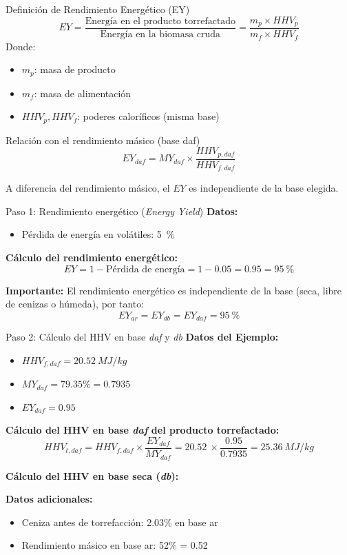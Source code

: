 \documentclass[main.tex]{subfiles}
\begin{document}
\begin{frame}{Definición de Rendimiento Energético (EY)}
\[
EY=\frac{\text{Energía en el producto torrefactado}}{\text{Energía en la biomasa cruda}}
     =\frac{m_p \times HHV_p}{m_f \times HHV_f}
\]
Donde:
\begin{itemize}
  \item $m_p$: masa de producto
  \item $m_f$: masa de alimentación
  \item $HHV_p, HHV_f$: poderes caloríficos (misma base)
\end{itemize}
\begin{block}{Relación con el rendimiento másico (base daf)}
\[
EY_{daf}= MY_{daf} \times \frac{HHV_{p,daf}}{HHV_{f,daf}}
\]
\end{block}
A diferencia del rendimiento másico, el $EY$ es independiente de la base elegida.
\end{frame}

\begin{frame}{Paso 1: Rendimiento energético (\textit{Energy Yield})}
\small
\textbf{Datos:}
\begin{itemize}
  \item Pérdida de energía en volátiles: \SI{5}{\percent}
\end{itemize}

\vspace{0.3cm}
\textbf{Cálculo del rendimiento energético:}
\[
EY = 1 - \text{Pérdida de energía} = 1 - 0.05 = 0.95 = \SI{95}{\percent}
\]

\vspace{0.3cm}
\textbf{Importante:} El rendimiento energético es independiente de la base (seca, libre de cenizas o húmeda), por tanto:
\[
EY_{ar} = EY_{db} = EY_{daf} = \SI{95}{\percent}
\]
\end{frame}


\begin{frame}{Paso 2: Cálculo del HHV en base \textit{daf} y \textit{db}}
\small
\textbf{Datos del Ejemplo:}
\begin{itemize}
  \item $HHV_{f,daf} = \SI{20.52}{MJ/kg}$
  \item $MY_{daf} = 79.35\% = 0.7935$
  \item $EY_{daf} = 0.95$
\end{itemize}

\textbf{Cálculo del HHV en base \textit{daf} del producto torrefactado:}
\[
HHV_{t,daf} = HHV_{f,daf} \times \frac{EY_{daf}}{MY_{daf}} = \SI{20.52}{} \times \frac{0.95}{0.7935} = \SI{25.36}{MJ/kg}
\]

\textbf{Cálculo del HHV en base seca (\textit{db}):}

\textbf{Datos adicionales:}
\begin{itemize}
  \item Ceniza antes de torrefacción: 2.03\% en base ar
  \item Rendimiento másico en base ar: 52\% = 0.52
\end{itemize}

\end{frame}
\end{document}
